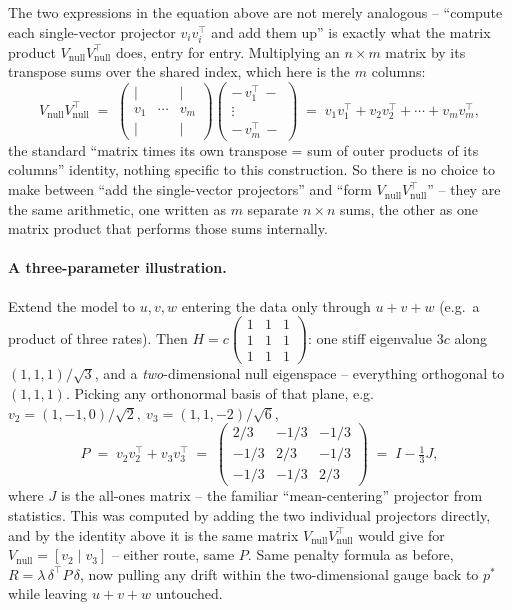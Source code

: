 \documentclass[11pt]{article}
\begin{document}
The two expressions in the equation above are not merely analogous --
``compute each single-vector projector $v_iv_i^\top$ and add them up'' is
exactly what the matrix product $V_{\mathrm{null}}V_{\mathrm{null}}^\top$
does, entry for entry. Multiplying an $n\times m$ matrix by its transpose
sums over the shared index, which here is the $m$ columns:
\begin{equation}
  V_{\mathrm{null}}V_{\mathrm{null}}^\top
  \;=\;
  \begin{pmatrix}\mid&&\mid\\ v_1&\cdots&v_m\\ \mid&&\mid\end{pmatrix}
  \begin{pmatrix}-\,v_1^\top\,-\\ \vdots\\ -\,v_m^\top\,-\end{pmatrix}
  \;=\;
  v_1v_1^\top + v_2v_2^\top + \cdots + v_mv_m^\top,
\end{equation}
the standard ``matrix times its own transpose = sum of outer products of its
columns'' identity, nothing specific to this construction. So there is no
choice to make between ``add the single-vector projectors'' and ``form
$V_{\mathrm{null}}V_{\mathrm{null}}^\top$'' -- they are the same arithmetic,
one written as $m$ separate $n\times n$ sums, the other as one matrix
product that performs those sums internally.

\paragraph{A three-parameter illustration.} Extend the model to $u,v,w$
entering the data only through $u+v+w$ (e.g.\ a product of three rates).
Then $H=c\begin{pmatrix}1&1&1\\1&1&1\\1&1&1\end{pmatrix}$: one stiff
eigenvalue $3c$ along $(1,1,1)/\sqrt3$, and a \emph{two}-dimensional null
eigenspace -- everything orthogonal to $(1,1,1)$. Picking any orthonormal
basis of that plane, e.g.\ $v_2=(1,-1,0)/\sqrt2,\ v_3=(1,1,-2)/\sqrt6$,
\begin{equation}
  P \;=\; v_2v_2^\top+v_3v_3^\top \;=\; \begin{pmatrix}2/3&-1/3&-1/3\\-1/3&2/3&-1/3\\-1/3&-1/3&2/3\end{pmatrix}
  \;=\; I-\tfrac13 J,
\end{equation}
where $J$ is the all-ones matrix -- the familiar ``mean-centering'' projector
from statistics. This was computed by adding the two individual projectors
directly, and by the identity above it is the same matrix
$V_{\mathrm{null}}V_{\mathrm{null}}^\top$ would give for
$V_{\mathrm{null}}=[v_2\mid v_3]$ -- either route, same $P$. Same penalty
formula as before, $R=\lambda\,\delta^\top P\,\delta$, now pulling any drift
within the two-dimensional gauge back to $p^*$ while leaving $u+v+w$
untouched.
\end{document}
